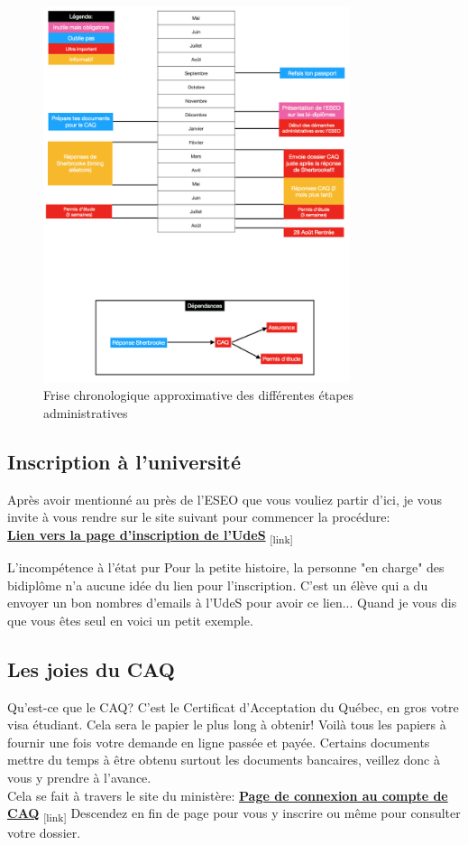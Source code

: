\begin{figure}[h!]
\centering
\includegraphics[width = 90mm]{figures/Chrono_Sherbrooke}
\caption{Frise chronologique approximative des différentes étapes administratives}
\end{figure}

\subsection{Inscription à l'université}\label{sec:sec3.2.2}
Après avoir mentionné au près de l'ESEO que vous vouliez partir d'ici, je vous invite à vous rendre sur le site suivant pour commencer la procédure: \\
\href{https://www.usherbrooke.ca/helios/lib880/infoadm/cw/wda1/CLW301F1}{\textbf{Lien vers la page d'inscription de l'UdeS}}\textsubscript{  [link]}


\begin{example}{L'incompétence à l'état pur}
  Pour la petite histoire, la personne "en charge" des bidiplôme n'a aucune idée du lien pour l'inscription. C'est un élève qui a du envoyer un bon nombres d'emails à l'UdeS pour avoir ce lien... Quand je vous dis que vous êtes seul en voici un petit exemple.
\end{example}


\subsection{Les joies du CAQ}\label{sec:sec3.2.3}
Qu'est-ce que le CAQ? C'est le Certificat d'Acceptation du Québec, en gros votre visa étudiant. Cela sera le papier le plus long à obtenir!
Voilà tous les papiers à fournir une fois votre demande en ligne passée et payée. Certains documents mettre du temps à être obtenu surtout les documents bancaires, veillez donc à vous y prendre à l'avance. \\
Cela se fait à travers le site du ministère:
\bigbreak
\href{http://www.immigration-quebec.gouv.qc.ca/fr/services/caq-electronique/index.html}{\textbf{Page de connexion au compte de CAQ}}\textsubscript{  [link]}
\bigbreak
Descendez en fin de page pour vous y inscrire ou même pour consulter votre dossier.


